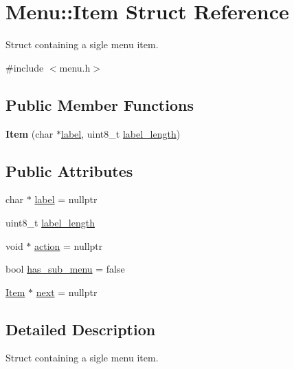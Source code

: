 \hypertarget{struct_menu_1_1_item}{}\section{Menu\+:\+:Item Struct Reference}
\label{struct_menu_1_1_item}


Struct containing a sigle menu item.  




{\ttfamily \#include $<$menu.\+h$>$}

\subsection*{Public Member Functions}
\begin{DoxyCompactItemize}
\item 
{\bfseries Item} (char $\ast$\hyperlink{struct_menu_1_1_item_a378723382fc64c752a85ffe6fec9707e}{label}, uint8\+\_\+t \hyperlink{struct_menu_1_1_item_a46749d046bbbde8d5308848d5394c2dc}{label\+\_\+length})\hypertarget{struct_menu_1_1_item_ad87fb2f4d51e4c095b93af5ea4bd2275}{}\label{struct_menu_1_1_item_ad87fb2f4d51e4c095b93af5ea4bd2275}

\end{DoxyCompactItemize}
\subsection*{Public Attributes}
\begin{DoxyCompactItemize}
\item 
char $\ast$ \hyperlink{struct_menu_1_1_item_a378723382fc64c752a85ffe6fec9707e}{label} = nullptr
\item 
uint8\+\_\+t \hyperlink{struct_menu_1_1_item_a46749d046bbbde8d5308848d5394c2dc}{label\+\_\+length}
\item 
void $\ast$ \hyperlink{struct_menu_1_1_item_a247e140fed2addf80986ba5a3506b9dd}{action} = nullptr
\item 
bool \hyperlink{struct_menu_1_1_item_a5c9895a137458b9a12dafd447ac7430b}{has\+\_\+sub\+\_\+menu} = false
\item 
\hyperlink{struct_menu_1_1_item}{Item} $\ast$ \hyperlink{struct_menu_1_1_item_aadcc1e4e824296c6b72ac7d053f06869}{next} = nullptr
\end{DoxyCompactItemize}


\subsection{Detailed Description}
Struct containing a sigle menu item. 

